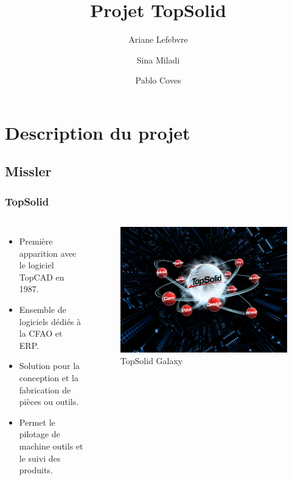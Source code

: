 \documentclass{beamer}
\title{Projet TopSolid}
\author{Ariane Lefebvre \and Sina Miladi \and Pablo Coves}
\date{}
\begin{document}
\maketitle

\section{Description du projet}
\subsection{Missler}
\begin{frame}
    \frametitle{TopSolid}
    \begin{columns}
        \begin{itemize}
            \item Première apparition avec le logiciel TopCAD en 1987.
            \item Ensemble de logiciels dédiés à la CFAO et ERP.\\
            \item Solution pour la conception et la fabrication de pièces ou outils.
            \item Permet le pilotage de machine outils et le suivi des produits.
        \end{itemize}
        \begin{figure}
            \includegraphics[width=\textwidth]{img/topSolid.jpg}
            \caption{TopSolid Galaxy}
            \label{TopSolid}
        \end{figure}
    \end{columns}
\end{frame}
\end{document}
